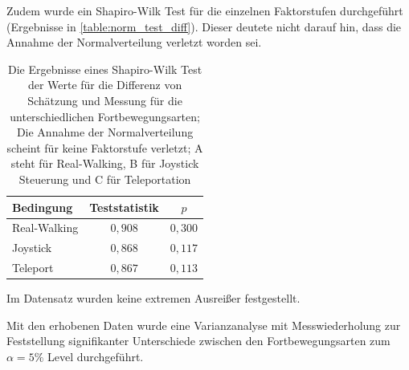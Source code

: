                     Zudem wurde ein Shapiro-Wilk Test für die einzelnen Faktorstufen durchgeführt (Ergebnisse in \autoref{table:norm_test_diff}). Dieser deutete nicht darauf hin, dass die Annahme der Normalverteilung verletzt worden sei.

                    \begin{table}[!h]
                        \renewcommand\arraystretch{1.2}
                        \centering
                        \begin{tabular}{lcc} \toprule
                            Bedingung    & Teststatistik    & $p$   \\ \midrule
                            Real-Walking & $0,908$            & $0,300$ \\
                            Joystick     & $0,868$            & $0,117$ \\
                            Teleport     & $0,867$            & $0,113$ \\ \bottomrule
                        \end{tabular}
                        \caption{Die Ergebnisse eines Shapiro-Wilk Test der Werte für die Differenz von Schätzung und Messung für die unterschiedlichen Fortbewegungsarten; Die Annahme der Normalverteilung scheint für keine Faktorstufe verletzt; A steht für Real-Walking, B für Joystick Steuerung und C für Teleportation}\label{table:norm_test_diff}
                    \end{table}

                    Im Datensatz wurden keine extremen Ausreißer %
                    festgestellt.

                    Mit den erhobenen Daten wurde eine Varianzanalyse mit Messwiederholung zur Feststellung signifikanter Unterschiede zwischen den Fortbewegungsarten zum $\alpha = 5\%$ Level durchgeführt.






